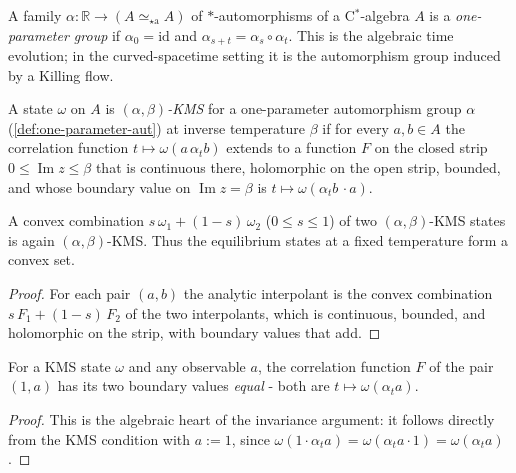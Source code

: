 \begin{definition}
    \label{def:one-parameter-aut}
    \leanok
    A family $\alpha : \mathbb{R} \to (A \simeq_{\star\mathrm{a}} A)$ of $*$-automorphisms of a C$^*$-algebra $A$ is a \emph{one-parameter group} if $\alpha_0 = \mathrm{id}$ and $\alpha_{s+t} = \alpha_s \circ \alpha_t$. This is the algebraic time evolution; in the curved-spacetime setting it is the automorphism group induced by a Killing flow.
\end{definition}

\begin{definition}
    \label{def:kms-state}
    \leanok
    A state $\omega$ on $A$ is \emph{$(\alpha, \beta)$-KMS} for a one-parameter automorphism group $\alpha$ (\ref{def:one-parameter-aut}) at inverse temperature $\beta$ if for every $a, b \in A$ the correlation function $t \mapsto \omega(a\,\alpha_t b)$ extends to a function $F$ on the closed strip $0 \le \operatorname{Im} z \le \beta$ that is continuous there, holomorphic on the open strip, bounded, and whose boundary value on $\operatorname{Im} z = \beta$ is $t \mapsto \omega(\alpha_t b\, \cdot a)$.
\end{definition}

\begin{theorem}
    \label{thrm:kms-convex}
    \leanok
    A convex combination $s\,\omega_1 + (1-s)\,\omega_2$ ($0 \le s \le 1$) of two $(\alpha, \beta)$-KMS states is again $(\alpha, \beta)$-KMS. Thus the equilibrium states at a fixed temperature form a convex set.
\end{theorem}
\begin{proof}
    \leanok
    For each pair $(a, b)$ the analytic interpolant is the convex combination $s\,F_1 + (1-s)\,F_2$ of the two interpolants, which is continuous, bounded, and holomorphic on the strip, with boundary values that add.
\end{proof}

\begin{lemma}[Boundary Coincidence for $a = 1$]
    \label{lmm:kms-correlation-one}
    \leanok
    For a KMS state $\omega$ and any observable $a$, the correlation function $F$ of the pair $(1, a)$ has its two boundary values \emph{equal} - both are $t \mapsto \omega(\alpha_t a)$.
\end{lemma}
\begin{proof}
    \leanok
    This is the algebraic heart of the invariance argument: it follows directly from the KMS condition with $a := 1$, since $\omega(1\cdot\alpha_t a) = \omega(\alpha_t a \cdot 1) = \omega(\alpha_t a)$.
\end{proof}

